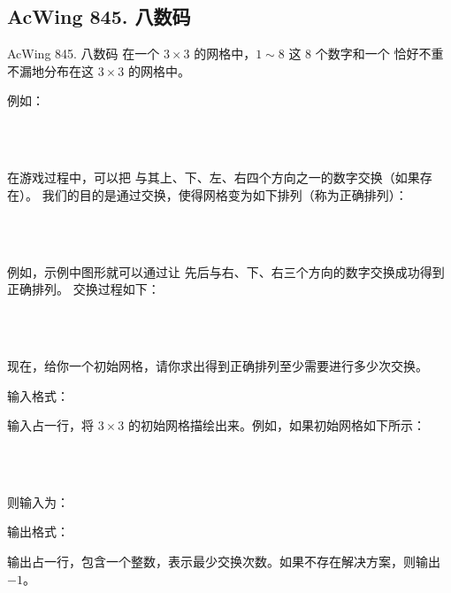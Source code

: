 \subsection{AcWing 845. 八数码}
\begin{titledbox}{AcWing 845. 八数码}
    在一个 $3 \times 3$ 的网格中，$1 \sim 8$ 这 $8$ 个数字和一个  恰好不重不漏地分布在这 $3 \times 3$ 的网格中。

    例如：

     \\
     \\

    在游戏过程中，可以把  与其上、下、左、右四个方向之一的数字交换（如果存在）。
    我们的目的是通过交换，使得网格变为如下排列（称为正确排列）：

     \\
     \\

    例如，示例中图形就可以通过让  先后与右、下、右三个方向的数字交换成功得到正确排列。
    交换过程如下：

     \hspace{1em}  \hspace{1em}  \hspace{1em}  \\
     \hspace{1em}  \hspace{1em}  \hspace{1em}  \\
     \hspace{1em}  \hspace{1em}  \hspace{1em} 

    现在，给你一个初始网格，请你求出得到正确排列至少需要进行多少次交换。

    输入格式：

    输入占一行，将 $3 \times 3$ 的初始网格描绘出来。例如，如果初始网格如下所示：

     \\
     \\

    则输入为：

    输出格式：

    输出占一行，包含一个整数，表示最少交换次数。如果不存在解决方案，则输出 $-1$。

    \begin{inputblock}
    \end{inputblock}
    \begin{outputblock}
    \end{outputblock}
\end{titledbox}


